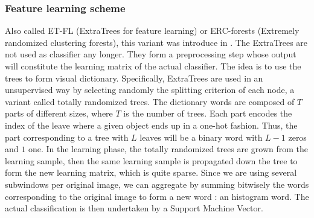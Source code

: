 \documentclass[a4paper]{report}
\begin{document}
			
			
			
			\subsubsection{Feature learning scheme}
			Also called ET-FL (ExtraTrees for feature learning) or ERC-forests (Extremely randomized clustering forests), this variant was introduce in \cite{ETFL}. The ExtraTrees are not used as classifier any longer. They form a preprocessing step whose output will constitute the learning matrix of the actual classifier. The idea is to use the trees to form visual dictionary. Specifically, ExtraTrees are used in an unsupervised way by selecting randomly the splitting criterion of each node, a variant called totally randomized trees. The dictionary words are composed of $T$ parts of different sizes, where $T$ is the number of trees. Each part encodes the index of the leave where a given object ends up in a one-hot fashion. Thus, the part corresponding to a tree with $L$ leaves will be a binary word with $L-1$ zeros and $1$ one. In the learning phase, the totally randomized trees are grown from the learning sample, then the same learning sample is propagated down the tree to form the new learning matrix, which is quite sparse. Since we are using several subwindows per original image, we can aggregate by summing bitwisely the words corresponding to the original image to form a new word : an histogram word.
		The actual classification is then undertaken by a Support Machine Vector. %
\end{document}
